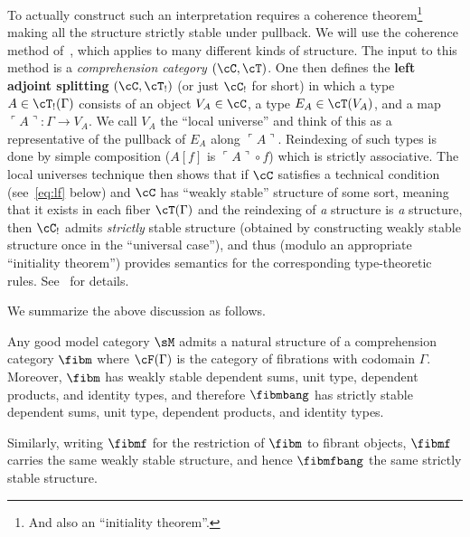 \documentclass[referee]{psp}
\def\name#1{\ulcorner #1\urcorner}
\let\C\cC
\let\T\cT
\begin{document}
To actually construct such an interpretation requires a coherence theorem\footnote{And also an ``initiality theorem''.} making all the structure strictly stable under pullback.
We will use the coherence method of~\cite{lw:localuniv}, which applies to many different kinds of structure.
The input to this method is a \emph{comprehension category} $(\C,\T)$.
One then defines the \textbf{left adjoint splitting} $(\C,\T_!)$ (or just $\C_!$ for short) in which a type $A\in \T_!(\Gamma)$ consists of an object $V_A\in\C$, a type $E_A\in\T(V_A)$, and a map $\name{A}:\Gamma\to V_A$.
We call $V_A$ the ``local universe'' and think of this as a representative of the pullback of $E_A$ along $\name{A}$.
Reindexing of such types is done by simple composition ($A[f]$ is $\name{A}\circ f$) which is strictly associative.
The local universes technique then shows that if $\C$ satisfies a technical condition (see~\eqref{eq:lf} below) and $\C$ has ``weakly stable'' structure of some sort, meaning that it exists in each fiber $\T(\Gamma)$ and the reindexing of \emph{a} structure is \emph{a} structure, then $\C_!$ admits \emph{strictly} stable structure (obtained by constructing weakly stable structure once in the ``universal case''), and thus (modulo an appropriate ``initiality theorem'') provides semantics for the corresponding type-theoretic rules.
See~\cite{lw:localuniv} for details.

We summarize the above discussion as follows.

\begin{thm}\label{thm:gmc-tt}
  Any good model category $\sM$ admits a natural structure of a comprehension category $\fibm$ where $\cF(\Gamma)$ is the category of fibrations with codomain $\Gamma$.
  Moreover, $\fibm$ has weakly stable dependent sums, unit type, dependent products, and identity types, and therefore $\fibmbang$ has strictly stable dependent sums, unit type, dependent products, and identity types.

  Similarly, writing $\fibmf$ for the restriction of $\fibm$ to fibrant objects, $\fibmf$ carries the same weakly stable structure, and hence $\fibmfbang$ the same strictly stable structure.
\end{thm}


\end{document}
